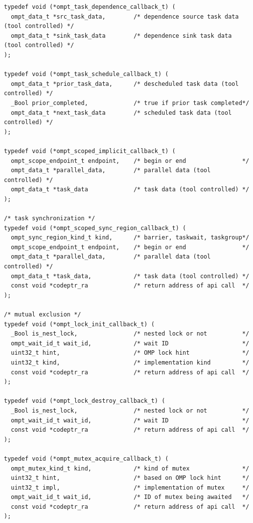 \documentclass{article}
\begin{document}
\begin{verbatim}
typedef void (*ompt_task_dependence_callback_t) (
  ompt_data_t *src_task_data,        /* dependence source task data (tool controlled) */
  ompt_data_t *sink_task_data        /* dependence sink task data (tool controlled) */
);

typedef void (*ompt_task_schedule_callback_t) (
  ompt_data_t *prior_task_data,      /* descheduled task data (tool controlled) */
  _Bool prior_completed,             /* true if prior task completed*/
  ompt_data_t *next_task_data        /* scheduled task data (tool controlled) */
);

typedef void (*ompt_scoped_implicit_callback_t) ( 
  ompt_scope_endpoint_t endpoint,    /* begin or end                */
  ompt_data_t *parallel_data,        /* parallel data (tool controlled) */
  ompt_data_t *task_data             /* task data (tool controlled) */
);

/* task synchronization */
typedef void (*ompt_scoped_sync_region_callback_t) ( 
  ompt_sync_region_kind_t kind,      /* barrier, taskwait, taskgroup*/
  ompt_scope_endpoint_t endpoint,    /* begin or end                */ 
  ompt_data_t *parallel_data,        /* parallel data (tool controlled) */
  ompt_data_t *task_data,            /* task data (tool controlled) */
  const void *codeptr_ra             /* return address of api call  */
);

/* mutual exclusion */
typedef void (*ompt_lock_init_callback_t) (
  _Bool is_nest_lock,                /* nested lock or not          */
  ompt_wait_id_t wait_id,            /* wait ID                     */
  uint32_t hint,                     /* OMP lock hint               */
  uint32_t kind,                     /* implementation kind         */
  const void *codeptr_ra             /* return address of api call  */
);

typedef void (*ompt_lock_destroy_callback_t) (
  _Bool is_nest_lock,                /* nested lock or not          */
  ompt_wait_id_t wait_id,            /* wait ID                     */
  const void *codeptr_ra             /* return address of api call  */
);

typedef void (*ompt_mutex_acquire_callback_t) ( 
  ompt_mutex_kind_t kind,            /* kind of mutex               */
  uint32_t hint,                     /* based on OMP lock hint      */
  uint32_t impl,                     /* implementation of mutex     */
  ompt_wait_id_t wait_id,            /* ID of mutex being awaited   */
  const void *codeptr_ra             /* return address of api call  */          
);


\end{verbatim}
\end{document}
